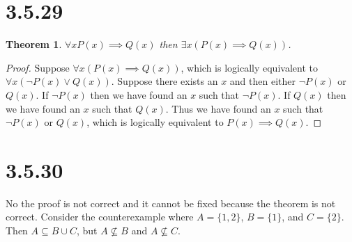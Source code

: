 \documentclass{article}
\newtheorem*{theorem}{Theorem}  %
\begin{document}
\section*{3.5.29}
\begin{theorem} $\forall x P(x) \implies Q(x)$ then $\exists x (P(x) \implies Q(x))$.
\end{theorem}

\begin{proof}
Suppose $\forall x (P(x) \implies Q(x))$, which is logically equivalent to $\forall x (\lnot P(x) \lor Q(x))$. Suppose there exists an $x$ and then either $\lnot P(x)$ or $Q(x)$. If $\lnot P(x)$ then we have found an $x$ such that $\lnot P(x)$. If $Q(x)$ then we have found an $x$ such that $Q(x)$. Thus we have found an $x$ such that $\lnot P(x)$ or $Q(x)$, which is logically equivalent to $P(x) \implies Q(x)$.
\end{proof}

\section*{3.5.30}
No the proof is not correct and it cannot be fixed because the theorem is not correct. Consider the counterexample where $A = \{1,2\}$, $B = \{1\}$, and $C = \{2\}$. Then $A \subseteq B \cup C$, but $A \not\subseteq B$ and $A \not\subseteq C$.
\end{document}
